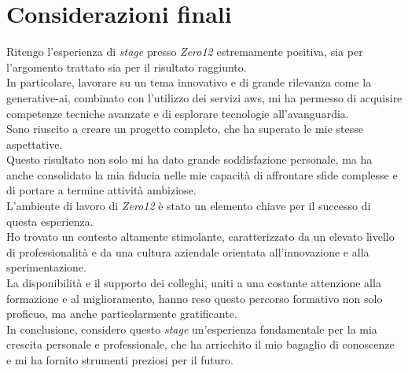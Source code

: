 \pagebreak
\section{Considerazioni finali}
\label{sec:considetazioni-finali}

Ritengo l’esperienza di \textit{stage} presso \textit{Zero12} estremamente positiva, sia per l’argomento trattato sia per il risultato raggiunto.\\
In particolare, lavorare su un tema innovativo e di grande rilevanza come la \gls{generative-ai}, combinato con l’utilizzo dei servizi \gls{aws}, mi ha permesso di acquisire competenze tecniche avanzate e di esplorare tecnologie all’avanguardia. \\ 

\noindent Sono riuscito a creare un progetto completo, che ha superato le mie stesse aspettative.\\
Questo risultato non solo mi ha dato grande soddisfazione personale, ma ha anche consolidato la mia fiducia nelle mie capacità di affrontare sfide complesse e di portare a termine attività ambiziose.\\  

\noindent L’ambiente di lavoro di \textit{Zero12} è stato un elemento chiave per il successo di questa esperienza.\\
Ho trovato un contesto altamente stimolante, caratterizzato da un elevato livello di professionalità e da una cultura aziendale orientata all’innovazione e alla sperimentazione.\\
La disponibilità e il supporto dei colleghi, uniti a una costante attenzione alla formazione e al miglioramento, hanno reso questo percorso formativo non solo proficuo, ma anche particolarmente gratificante. \\

\noindent In conclusione, considero questo \textit{stage} un’esperienza fondamentale per la mia crescita personale e professionale, che ha arricchito il mio bagaglio di conoscenze e mi ha fornito strumenti preziosi per il futuro.